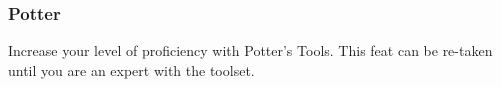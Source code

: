 \subsubsection{Potter} \label{feat::potter}
    Increase your level of proficiency with Potter's Tools.
    This feat can be re-taken until you are an expert with the toolset.


